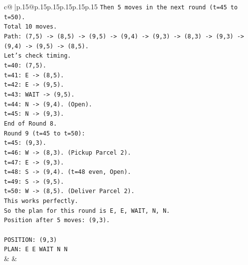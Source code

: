 \documentclass{article}
\begin{document}
{\begin{supertabular}{c@{$\;$}|p{.15\linewidth}@{}p{.15\linewidth}p{.15\linewidth}p{.15\linewidth}p{.15\linewidth}p{.15\linewidth}}
{{{\texttt{Then 5 moves in the next round (t=45 to t=50).} \\
\texttt{Total 10 moves.} \\
\texttt{Path: (7,5) {-}> (8,5) {-}> (9,5) {-}> (9,4) {-}> (9,3) {-}> (8,3) {-}> (9,3) {-}> (9,4) {-}> (9,5) {-}> (8,5).} \\
\texttt{Let's check timing.} \\
\texttt{t=40: (7,5).} \\
\texttt{t=41: E {-}> (8,5).} \\
\texttt{t=42: E {-}> (9,5).} \\
\texttt{t=43: WAIT {-}> (9,5).} \\
\texttt{t=44: N {-}> (9,4). (Open).} \\
\texttt{t=45: N {-}> (9,3).} \\
\texttt{End of Round 8.} \\
\texttt{Round 9 (t=45 to t=50):} \\
\texttt{t=45: (9,3).} \\
\texttt{t=46: W {-}> (8,3). (Pickup Parcel 2).} \\
\texttt{t=47: E {-}> (9,3).} \\
\texttt{t=48: S {-}> (9,4). (t=48 even, Open).} \\
\texttt{t=49: S {-}> (9,5).} \\
\texttt{t=50: W {-}> (8,5). (Deliver Parcel 2).} \\
\texttt{This works perfectly.} \\
\texttt{So the plan for this round is E, E, WAIT, N, N.} \\
\texttt{Position after 5 moves: (9,3).} \\
\\ 
\texttt{POSITION: (9,3)} \\
\texttt{PLAN: E E WAIT N N} \\
            }
        }
    }
    & & \\ \\


\end{supertabular}}
\end{document}
